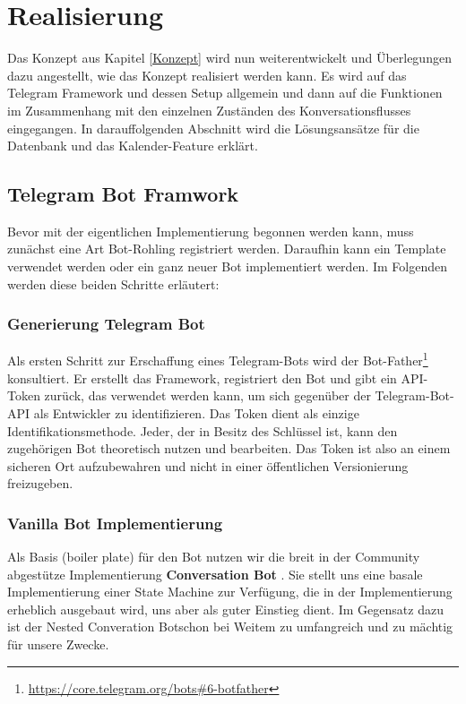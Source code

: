 \label{Realisierung}
\chapter{Realisierung}

    Das Konzept aus Kapitel \ref*{Konzept} wird nun weiterentwickelt und Überlegungen dazu angestellt, wie das Konzept realisiert werden kann. Es wird auf das Telegram Framework und dessen Setup allgemein und dann auf die Funktionen im Zusammenhang mit den einzelnen Zuständen des Konversationsflusses eingegangen. In darauffolgenden Abschnitt wird die Lösungsansätze für die Datenbank und das Kalender-Feature erklärt.

    \section{Telegram Bot Framwork}

        Bevor mit der eigentlichen Implementierung begonnen werden kann, muss zunächst eine Art Bot-Rohling registriert werden. Daraufhin kann ein Template verwendet werden oder ein ganz neuer Bot implementiert werden. Im Folgenden werden diese beiden Schritte erläutert:

        \subsection{Generierung Telegram Bot} \label{Realisierung: botfather}
            Als ersten Schritt zur Erschaffung eines Telegram-Bots wird der Bot-Father\footnote{\url{https://core.telegram.org/bots\#6-botfather}} konsultiert. Er erstellt das Framework, registriert den Bot und gibt ein API-Token zurück, das verwendet werden kann, um sich gegenüber der Telegram-Bot-API als Entwickler zu identifizieren. \cite{telegramAPI} Das Token dient als einzige Identifikationsmethode. Jeder, der in Besitz des Schlüssel ist, kann den zugehörigen Bot theoretisch nutzen und bearbeiten. Das Token ist also an einem sicheren Ort aufzubewahren und nicht in einer öffentlichen Versionierung freizugeben.

        \subsection{Vanilla Bot Implementierung}
            Als Basis (boiler plate) für den Bot nutzen wir die breit in der Community abgestütze Implementierung \textbf{Conversation Bot} \cite{conversationBot}. Sie stellt uns eine basale Implementierung einer State Machine zur Verfügung, die in der Implementierung erheblich ausgebaut wird, uns aber als guter Einstieg dient. Im Gegensatz dazu ist der \glqq Nested Converation Bot\grqq schon bei Weitem zu umfangreich und zu mächtig für unsere Zwecke.
            
